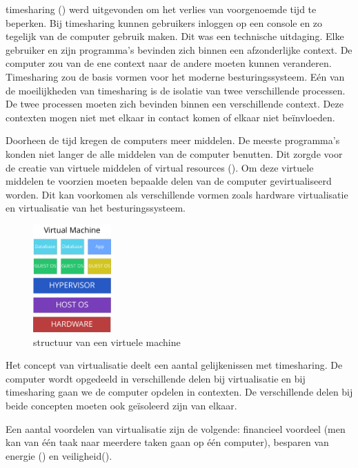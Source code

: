 \documentclass[pdftex,a4paper,12pt,twoside]{report}
\begin{document}
timesharing (\cite{pyke_jr._time-shared_1967}) werd uitgevonden om het verlies van voorgenoemde tijd te beperken. Bij timesharing kunnen gebruikers inloggen op een console en zo tegelijk van de computer gebruik maken. Dit was een technische uitdaging. Elke gebruiker en zijn programma's bevinden zich binnen een afzonderlijke context. De computer zou van de ene context naar de andere moeten kunnen veranderen. Timesharing zou de basis vormen voor het moderne besturingssysteem. Eén van de moeilijkheden van timesharing is de isolatie van twee verschillende processen. De twee processen moeten zich bevinden binnen een verschillende context. Deze contexten mogen niet met elkaar in contact komen of elkaar niet beïnvloeden.

Doorheen de tijd kregen de computers meer middelen. De meeste programma's konden niet langer de alle middelen van de computer benutten. Dit zorgde voor de creatie van virtuele middelen of virtual resources (\cite{vakilinia_modeling_2015}). Om deze virtuele middelen te voorzien moeten bepaalde delen van de computer gevirtualiseerd worden. Dit kan voorkomen als verschillende vormen zoals hardware virtualisatie en virtualisatie van het besturingssysteem.

\begin{figure}
    \centering
    \includegraphics[width=3cm]{img/virtual-machine}
    \caption{structuur van een virtuele machine}
    \label{fig:virtualmachine}
\end{figure}

Het concept van virtualisatie deelt een aantal gelijkenissen met timesharing. De computer wordt opgedeeld in verschillende delen bij virtualisatie en bij timesharing gaan we de computer opdelen in contexten. De verschillende delen bij beide concepten moeten ook geïsoleerd zijn van elkaar.

Een aantal voordelen van virtualisatie zijn de volgende: financieel voordeel (men kan van één taak naar meerdere taken gaan op één computer), besparen van energie (\cite{beloglazov_energy_2010}) en veiligheid(\cite{mortleman_security_2009}).
\end{document}
